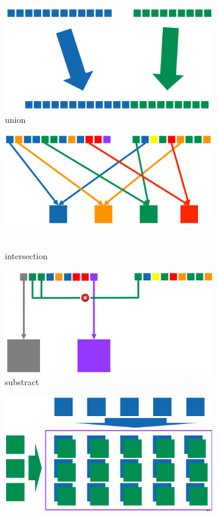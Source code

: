 \documentclass[11pt,oneside,a4paper]{article}
\begin{document}
\begin{figure}[hb!]
	\centering
	\begin{subfigure}[t]{.21\textwidth}
		\centering
		\includegraphics[width=0.9\linewidth]{figures/spark_union}
		\caption{union}
	\end{subfigure}%
	\begin{subfigure}[t]{.21\textwidth}
		\centering
		\includegraphics[width=0.9\linewidth]{figures/spark_intersection}\
		\caption{intersection}
	\end{subfigure}
	\begin{subfigure}[t]{.21\textwidth}
		\centering
		\includegraphics[width=0.9\linewidth]{figures/spark_substract}
		\caption{substract}
	\end{subfigure}
	\begin{subfigure}[t]{.21\textwidth}
	\centering
	\includegraphics[width=0.9\linewidth]{figures/spark_cart_product}

\end{subfigure}
\end{figure}
\end{document}
